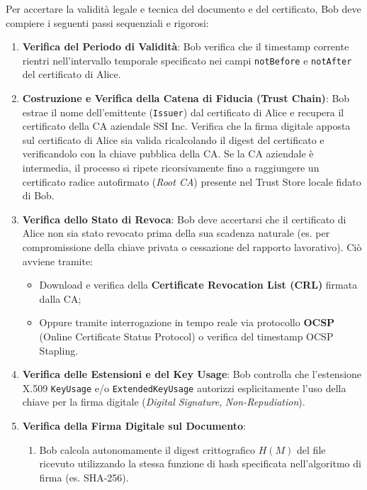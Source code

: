 \documentclass[11pt,a4paper]{article}
\begin{document}
\begin{solutionbox}
Per accertare la validit\`a legale e tecnica del documento e del certificato, Bob deve compiere i seguenti passi sequenziali e rigorosi:
\begin{enumerate}
    \item \textbf{Verifica del Periodo di Validit\`a}: Bob verifica che il timestamp corrente rientri nell'intervallo temporale specificato nei campi \texttt{notBefore} e \texttt{notAfter} del certificato di Alice.
    \item \textbf{Costruzione e Verifica della Catena di Fiducia (Trust Chain)}: Bob estrae il nome dell'emittente (\texttt{Issuer}) dal certificato di Alice e recupera il certificato della CA aziendale SSI Inc. Verifica che la firma digitale apposta sul certificato di Alice sia valida ricalcolando il digest del certificato e verificandolo con la chiave pubblica della CA. Se la CA aziendale \`e intermedia, il processo si ripete ricorsivamente fino a raggiungere un certificato radice autofirmato (\textit{Root CA}) presente nel Trust Store locale fidato di Bob.
    \item \textbf{Verifica dello Stato di Revoca}: Bob deve accertarsi che il certificato di Alice non sia stato revocato prima della sua scadenza naturale (es. per compromissione della chiave privata o cessazione del rapporto lavorativo). Ci\`o avviene tramite:
    \begin{itemize}
        \item Download e verifica della \textbf{Certificate Revocation List (CRL)} firmata dalla CA;
        \item Oppure tramite interrogazione in tempo reale via protocollo \textbf{OCSP} (Online Certificate Status Protocol) o verifica del timestamp OCSP Stapling.
    \end{itemize}
    \item \textbf{Verifica delle Estensioni e del Key Usage}: Bob controlla che l'estensione X.509 \texttt{KeyUsage} e/o \texttt{ExtendedKeyUsage} autorizzi esplicitamente l'uso della chiave per la firma digitale (\textit{Digital Signature}, \textit{Non-Repudiation}).
    \item \textbf{Verifica della Firma Digitale sul Documento}:
    \begin{enumerate}
        \item Bob calcola autonomamente il digest crittografico $H(M)$ del file ricevuto utilizzando la stessa funzione di hash specificata nell'algoritmo di firma (es. SHA-256).

\end{enumerate}
\end{enumerate}
\end{solutionbox}
\end{document}

